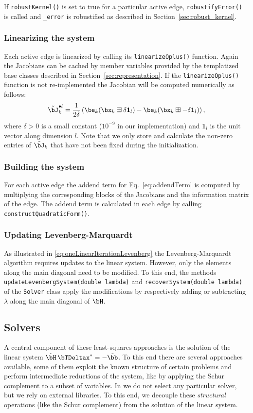 \documentclass[a4paper]{article}
\begin{document}
 If \verb+robustKernel()+ is set to true for a particular active edge,
\verb+robustifyError()+ is called and \verb+_error+ is robustified 
as described in Section~\ref{sec:robust_kernel}.

\subsubsection{Linearizing the system}
Each active edge is linearized by calling its
\verb+linearizeOplus()+ function. Again the Jacobians can be cached by
member variables provided by the templatized base classes described in 
Section~\ref{sec:representation}. If the \verb+linearizeOplus()+
function is not re-implemented the Jacobian will be computed
numerically as follows:
\begin{eqnarray}
  \tilde \bJ_k^{\bullet l} = \frac{1}{2\delta} \left(
  \be_k (\bx_k \boxplus \delta\mathbf{1}_l)
  -
  \be_k (\bx_k \boxplus -\delta\mathbf{1}_l)
  \right),
  \label{eqn:jacobiannumeric}
\end{eqnarray}
where $\delta > 0$ is a small constant ($10^{-9}$ in our
implementation) and $\mathbf{1}_l$ is the unit vector along dimension
$l$. Note that we only store and calculate the non-zero entries of
$\tilde \bJ_k$ that have not been fixed during the initialization.

\subsubsection{Building the system}
For each active edge the addend term for Eq.~\ref{eq:addendTerm} is
computed by multiplying the corresponding blocks of the Jacobians and
the information matrix of the edge. The addend term is calculated in
each edge by calling \verb+constructQuadraticForm()+.

\subsubsection{Updating Levenberg-Marquardt}
As illustrated in \eqref{eq:oneLinearIterationLevenberg} the
Levenberg-Marquardt algorithm requires updates to the linear system.
However, only the elements along the main diagonal need to be modified.
To this end, the methods \verb+updateLevenbergSystem(double lambda)+ and
\verb+recoverSystem(double lambda)+ of the \verb+Solver+ class apply the
modifications by respectively adding or subtracting $\lambda$ along the
main diagonal of $\bH$.

\subsection{Solvers}
A central component of these least-squares approaches is the solution
of the linear system $\tilde \bH \, \bTDeltax^* = - \tilde \bb$. To
this end there are several approaches available, some of them exploit
the known structure of certain problems and perform intermediate
reductions of the system, like by applying the Schur complement to a
subset of variables.  In \gopt{} we do not select any particular solver,
but we rely on external libraries.  To this end, we decouple these
\emph{structural} operations (like the Schur complement)
from the solution of the linear system.
\end{document}
